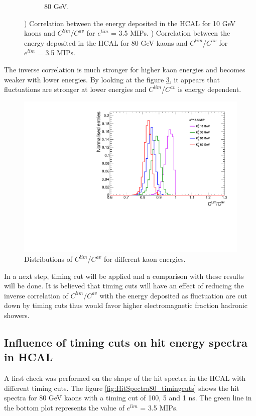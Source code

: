 \begin{figure}[htbp!]
\begin{subfigure}[t]{0.45\textwidth}
    \caption{80 GeV.} \label{fig:EhcalCLimCav80_100ns}
  \end{subfigure}
  \caption{) Correlation between the energy deposited in the HCAL for 10 GeV kaons and $C^{lim}$/$C^{av}$ for $e^{lim}$ = 3.5 MIPs. ) Correlation between the energy deposited in the HCAL for 80 GeV kaons and $C^{lim}$/$C^{av}$ for $e^{lim}$ = 3.5 MIPs.}
\end{figure}

The inverse correlation is much stronger for higher kaon energies and becomes weaker with lower energies. By looking at the figure \ref{fig:CLimCav_100ns}, it appears that fluctuations are stronger at lower energies and $C^{lim}$/$C^{av}$ is energy dependent.

\begin{figure}[htbp!]
  \centering
  \includegraphics[width=0.7\linewidth]{../Thesis_Plots/ILD/AdditionalPlots/Plots/CLimCav_100ns_SeveralEnergies.pdf}
  \caption{Distributions of $C^{lim}$/$C^{av}$ for different kaon energies.} \label{fig:CLimCav_100ns}
\end{figure}

In a next step, timing cut will be applied and a comparison with these results will be done. It is believed that timing cuts will have an effect of reducing the inverse correlation of $C^{lim}$/$C^{av}$ with the energy deposited as fluctuation are cut down by timing cuts thus would favor higher electromagnetic fraction hadronic showers.

\subsection{Influence of timing cuts on hit energy spectra in HCAL}

A first check was performed on the shape of the hit spectra in the HCAL with different timing cuts. The figure \ref{fig:HitSpectra80_timingcuts} shows the hit spectra for 80 GeV kaons with a timing cut of 100, 5 and 1 ns. The green line in the bottom plot represents the value of $e^{lim}$ = 3.5 MIPs.

